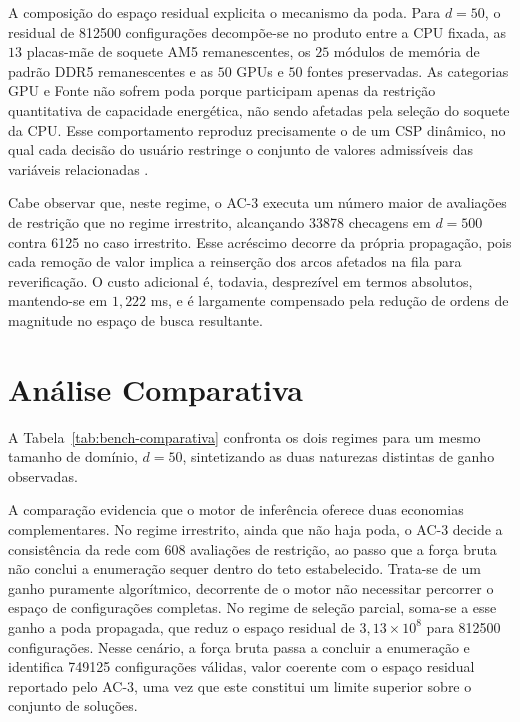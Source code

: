 A composição do espaço residual explicita o mecanismo da poda. Para $d=50$, o residual de
\num{812500} configurações decompõe-se no produto entre a CPU fixada, as $13$ placas-mãe de
soquete AM5 remanescentes, os $25$ módulos de memória de padrão DDR5 remanescentes e as $50$
GPUs e $50$ fontes preservadas. As categorias GPU e Fonte não sofrem poda porque participam
apenas da restrição quantitativa de capacidade energética, não sendo afetadas pela seleção do
soquete da CPU. Esse comportamento reproduz precisamente o de um CSP dinâmico, no qual cada
decisão do usuário restringe o conjunto de valores admissíveis das variáveis relacionadas
\cite{Mittal1989}.

Cabe observar que, neste regime, o AC-3 executa um número maior de avaliações de restrição
que no regime irrestrito, alcançando \num{33878} checagens em $d=500$ contra \num{6125} no caso
irrestrito. Esse acréscimo decorre da própria propagação, pois cada remoção de valor implica
a reinserção dos arcos afetados na fila para reverificação. O custo adicional é, todavia,
desprezível em termos absolutos, mantendo-se em $1{,}222$ ms, e é largamente compensado pela
redução de ordens de magnitude no espaço de busca resultante.

\section{Análise Comparativa}
\label{sec:resultado-comparativo}

A Tabela~\ref{tab:bench-comparativa} confronta os dois regimes para um mesmo tamanho de
domínio, $d=50$, sintetizando as duas naturezas distintas de ganho observadas.



A comparação evidencia que o motor de inferência oferece duas economias complementares. No
regime irrestrito, ainda que não haja poda, o AC-3 decide a consistência da rede com $608$
avaliações de restrição, ao passo que a força bruta não conclui a enumeração sequer dentro do
teto estabelecido. Trata-se de um ganho puramente algorítmico, decorrente de o motor não
necessitar percorrer o espaço de configurações completas. No regime de seleção parcial,
soma-se a esse ganho a poda propagada, que reduz o espaço residual de $3{,}13\times10^{8}$
para \num{812500} configurações. Nesse cenário, a força bruta passa a concluir a enumeração e
identifica \num{749125} configurações válidas, valor coerente com o espaço residual reportado
pelo AC-3, uma vez que este constitui um limite superior sobre o conjunto de soluções.

